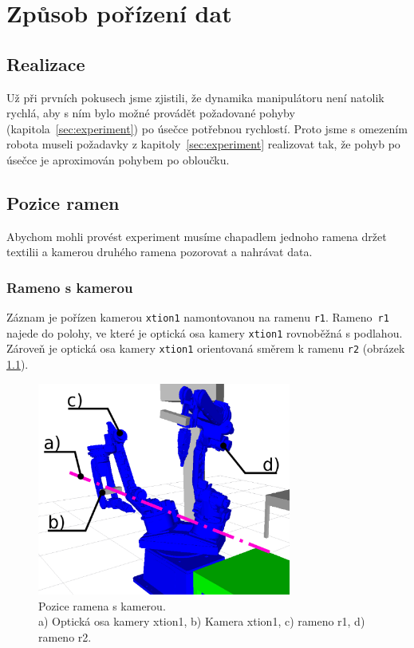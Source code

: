 \documentclass[10pt,a4paper,titlepage,oneside]{report}
\begin{document}

\chapter{Způsob pořízení dat}
\label{chap:proveData}
\section{Realizace}
Už při prvních pokusech jsme zjistili, že dynamika manipulátoru není natolik rychlá, aby s ním bylo možné provádět požadované pohyby (kapitola~\ref{sec:experiment}) po úsečce potřebnou rychlostí. Proto jsme s omezením robota museli požadavky z kapitoly~\ref{sec:experiment} realizovat tak, že pohyb po úsečce je aproximován pohybem po obloučku.\\



\section{Pozice ramen}
Abychom mohli provést experiment musíme chapadlem jednoho ramena držet textilii a kamerou druhého ramena pozorovat a nahrávat data.

\subsection{Rameno s kamerou}
\label{sec:posArmR1}
Záznam je pořízen kamerou \verb|xtion1| namontovanou na ramenu \verb|r1|. Rameno~\verb|r1| najede do polohy, ve které je optická osa kamery \verb|xtion1| rovnoběžná s podlahou. Zároveň je optická osa kamery \verb|xtion1| orientovaná směrem k ramenu \verb|r2| (obrázek \ref{fig:OptOsa}). \\
\begin{figure}[H]
	\centering  	
  	\includegraphics[height=7cm]{pictures/opOsa.eps}
  	\caption{Pozice ramena s kamerou.\\a) Optická osa kamery xtion1, b) Kamera xtion1, c) rameno r1, d) rameno r2.}
  	\label{fig:OptOsa}
\end{figure}
\end{document}
